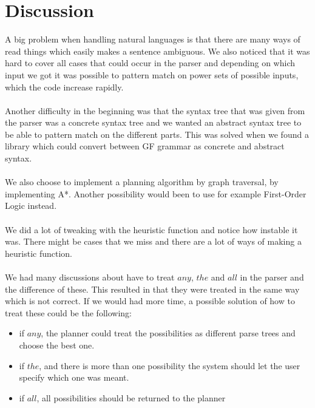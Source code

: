 \section{Discussion}
A big problem when handling natural languages is that there are many ways of read
things which easily makes a sentence ambiguous. We also noticed that it was
hard to cover all cases that could occur in the parser and depending on which
input we got it was possible to pattern match on power sets of possible inputs,
which the code increase rapidly. \\\\
Another difficulty in the beginning was that the syntax tree that was given
from the parser was a concrete syntax tree and we wanted an abstract syntax
tree to be able to pattern match on the different parts. This was solved when
we found a library which could convert between GF grammar as concrete and
abstract syntax. \\\\
We also choose to implement a planning algorithm by graph traversal, by
implementing A*. Another possibility would been to use for example First-Order
Logic instead. 
\\\\
We did a lot of tweaking with the heuristic function and notice how instable it
was. There might be cases that we miss and there are a lot of ways of making a
heuristic function.
\\\\
We had many discussions about have to treat $any$, $the$ and $all$ in the
parser and the difference of these. This resulted in that they were treated in
the same way which is not correct. If we would had more time, a possible solution 
of how to treat these could be the following: 
\begin{itemize}
\item if $any$, the planner could treat the possibilities as different parse trees and choose the best one. 
\item if $the$, and there is more than one possibility the system should let the user specify which one was meant. 
\item if $all$, all possibilities should be returned to the planner
\end{itemize}
